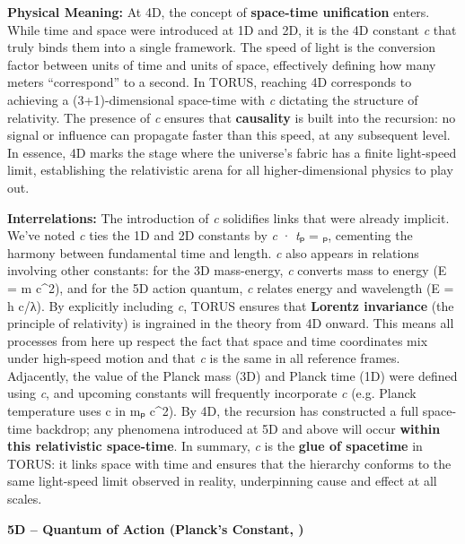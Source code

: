 \documentclass[
]{article}
\begin{document}
\textbf{Physical Meaning:} At 4D, the concept of \textbf{space-time
unification} enters. While time and space were introduced at 1D and 2D,
it is the 4D constant \emph{c} that truly binds them into a single
framework. The speed of light is the conversion factor between units of
time and units of space\hspace{0pt}, effectively defining how many
meters ``correspond'' to a second. In TORUS, reaching 4D corresponds to
achieving a (3+1)-dimensional space-time with \emph{c} dictating the
structure of relativity. The presence of \emph{c} ensures that
\textbf{causality} is built into the recursion: no signal or influence
can propagate faster than this speed, at any subsequent
level\hspace{0pt}. In essence, 4D marks the stage where the universe's
fabric has a finite light-speed limit, establishing the relativistic
arena for all higher-dimensional physics to play out.

\textbf{Interrelations:} The introduction of \emph{c} solidifies links
that were already implicit. We've noted \emph{c} ties the 1D and 2D
constants by \emph{c} · \emph{t}ₚ = \emph{\ell}ₚ\hspace{0pt}, cementing the
harmony between fundamental time and length. \emph{c} also appears in
relations involving other constants: for the 3D mass-energy, \emph{c}
converts mass to energy (E = m c\^{}2), and for the 5D action quantum,
\emph{c} relates energy and wavelength (E = h c/λ)\hspace{0pt}. By
explicitly including \emph{c}, TORUS ensures that \textbf{Lorentz
invariance} (the principle of relativity) is ingrained in the theory
from 4D onward. This means all processes from here up respect the fact
that space and time coordinates mix under high-speed motion and that
\emph{c} is the same in all reference frames. Adjacently, the value of
the Planck mass (3D) and Planck time (1D) were defined using \emph{c},
and upcoming constants will frequently incorporate \emph{c} (e.g. Planck
temperature uses c in mₚ c\^{}2). By 4D, the recursion has constructed a
full space-time backdrop; any phenomena introduced at 5D and above will
occur \textbf{within this relativistic space-time}\hspace{0pt}. In
summary, \emph{c} is the \textbf{glue of spacetime} in TORUS: it links
space with time and ensures that the hierarchy conforms to the same
light-speed limit observed in reality, underpinning cause and effect at
all scales.

\textbf{5D -- Quantum of Action (Planck's Constant, \hbar)}
\end{document}
